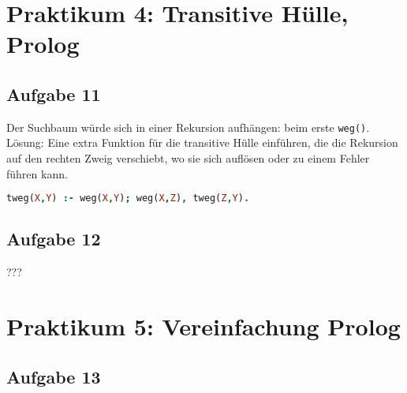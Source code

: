 \documentclass{scrreprt}
\begin{document}
\chapter{Praktikum 4: Transitive Hülle, Prolog}

\section{Aufgabe 11}
Der Suchbaum würde sich in einer Rekursion aufhängen: beim erste \lstinline$weg()$.\\
Lösung: Eine extra Funktion für die transitive Hülle einführen, die die Rekursion auf den rechten Zweig verschiebt, wo sie sich auflösen oder zu einem Fehler führen kann.
\begin{lstlisting}[language=Prolog]
tweg(X,Y) :- weg(X,Y); weg(X,Z), tweg(Z,Y).
\end{lstlisting}

\section{Aufgabe 12}
???

\chapter{Praktikum 5: Vereinfachung Prolog}

\section{Aufgabe 13}

\end{document}
